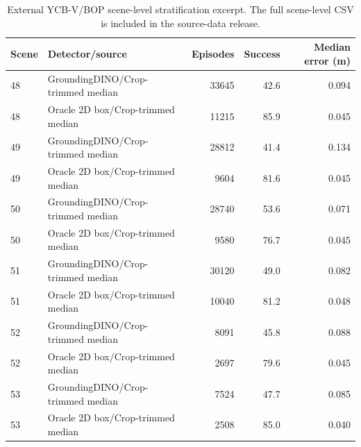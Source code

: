 \begin{table}[t]
\centering
\caption{External YCB-V/BOP scene-level stratification excerpt. The full scene-level CSV is included in the source-data release.}
\label{tab:external-rgbd-by-scene}
\scriptsize
\begin{tabular}{llrrr}
\toprule
Scene & Detector/source & Episodes & Success & Median error (m) \\
\midrule
48 & GroundingDINO/Crop-trimmed median & 33645 & 42.6 & 0.094 \\
48 & Oracle 2D box/Crop-trimmed median & 11215 & 85.9 & 0.045 \\
49 & GroundingDINO/Crop-trimmed median & 28812 & 41.4 & 0.134 \\
49 & Oracle 2D box/Crop-trimmed median & 9604 & 81.6 & 0.045 \\
50 & GroundingDINO/Crop-trimmed median & 28740 & 53.6 & 0.071 \\
50 & Oracle 2D box/Crop-trimmed median & 9580 & 76.7 & 0.045 \\
51 & GroundingDINO/Crop-trimmed median & 30120 & 49.0 & 0.082 \\
51 & Oracle 2D box/Crop-trimmed median & 10040 & 81.2 & 0.048 \\
52 & GroundingDINO/Crop-trimmed median & 8091 & 45.8 & 0.088 \\
52 & Oracle 2D box/Crop-trimmed median & 2697 & 79.6 & 0.045 \\
53 & GroundingDINO/Crop-trimmed median & 7524 & 47.7 & 0.085 \\
53 & Oracle 2D box/Crop-trimmed median & 2508 & 85.0 & 0.040 \\
\bottomrule
\end{tabular}
\end{table}
